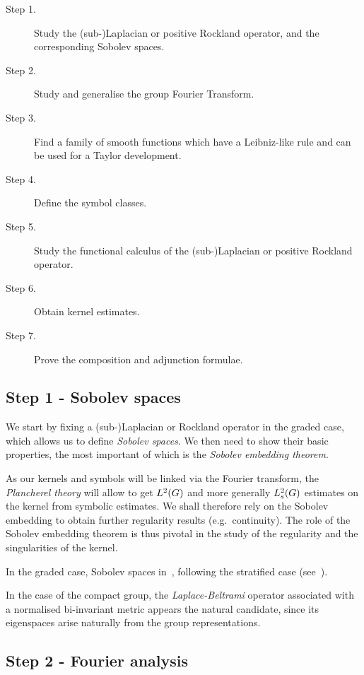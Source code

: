 \begin{description}
    \item[Step 1.] Study the (sub-)Laplacian or positive Rockland operator,
        and the corresponding Sobolev spaces.
    \item[Step 2.] Study and generalise the group Fourier Transform.
    \item[Step 3.] Find a family of smooth functions which have a Leibniz-like rule and can be used for a Taylor development.
    \item[Step 4.] Define the symbol classes.
    \item[Step 5.] Study the functional calculus of the (sub-)Laplacian or positive Rockland operator.
    \item[Step 6.] Obtain kernel estimates.
    \item[Step 7.] Prove the composition and adjunction formulae.
\end{description}

\subsection*{Step 1 - Sobolev spaces}

We start by fixing a (sub-)Laplacian or Rockland operator in the graded case,
which allows us to define \emph{Sobolev spaces}.
We then need to show their basic properties,
the most important of which is the \emph{Sobolev embedding theorem}.

As our kernels and symbols will be linked via the Fourier transform,
the \emph{Plancherel theory} will allow to get ${L^{2} (G)}$ and more generally $L^2_{s}(G)$ estimates on the kernel from symbolic estimates.
We shall therefore rely on the Sobolev embedding to obtain further regularity results (e.g.~continuity).
The role of the Sobolev embedding theorem is thus pivotal in the study of the regularity and the singularities of the kernel.

In the graded case,
Sobolev spaces in~\cite[Chapter 4]{FischerRuzhansky16},
following the stratified case (see~\cite{Folland75}).

In the case of the compact group,
the \emph{Laplace-Beltrami} operator associated with a normalised bi-invariant metric appears the natural candidate,
since its eigenspaces arise naturally from the group representations.

\subsection*{Step 2 - Fourier analysis}

